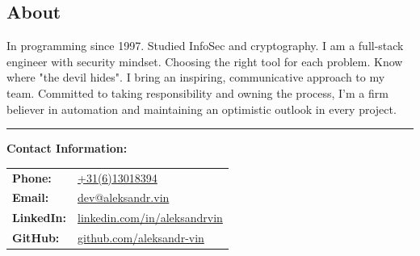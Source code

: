 \documentclass[letterpaper, 11pt]{article}
\begin{document}

\subsection*{About}

In programming since 1997. Studied InfoSec and cryptography. I am a full-stack engineer with security mindset.
Choosing the right tool for each problem. Know where "the devil hides". I bring an inspiring, communicative approach to my team.
Committed to taking responsibility and owning the process, I'm a firm believer in automation and maintaining an optimistic outlook in every project.












% 

\vspace{5em}
\hrule
\vspace{1em}

\noindent
\textbf{Contact Information:}

\vspace{1em}

\begin{tabular}{ll}
  \textbf{Phone:} & \href{tel:+31613018394}{\url{+31(6)13018394}} \\
  \textbf{Email:} & \href{mailto:dev@aleksandr.vin}{\url{dev@aleksandr.vin}} \\
  \textbf{LinkedIn:} & \href{https://linkedin.com/in/aleksandrvin}{\url{linkedin.com/in/aleksandrvin}} \\
  \textbf{GitHub:} & \href{https://github.com/aleksandr-vin}{\url{github.com/aleksandr-vin}}
\end{tabular}
\end{document}
